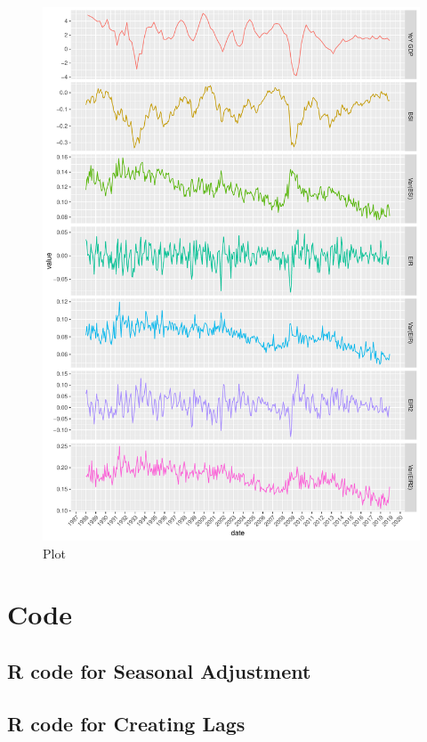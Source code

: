 \documentclass[12pt,a4paper,oneside]{book}
\begin{document}
\begin{figure}[H]
    \centering
    \captionsetup{justification=centering}
    \includegraphics[scale=0.8]{Graphs/variables.pdf}
    \caption{Plot }
    \label{plot:appendix all variabless}
\end{figure}


\chapter*{Code}
\section*{R code for Seasonal Adjustment}


\section*{R code for Creating Lags}
\end{document}
